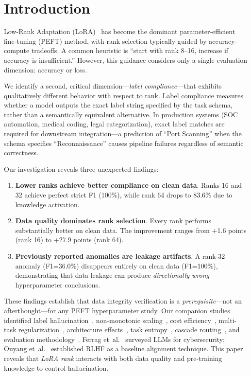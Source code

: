 \documentclass[journal]{IEEEtran}
\begin{document}
\section{Introduction}

Low-Rank Adaptation (LoRA)~\cite{hu2022} has become the dominant parameter-efficient fine-tuning (PEFT) method, with rank selection typically guided by accuracy-compute tradeoffs. A common heuristic is ``start with rank 8--16, increase if accuracy is insufficient.'' However, this guidance considers only a single evaluation dimension: accuracy or loss.

We identify a second, critical dimension---\emph{label compliance}---that exhibits qualitatively different behavior with respect to rank. Label compliance measures whether a model outputs the exact label string specified by the task schema, rather than a semantically equivalent alternative. In production systems (SOC automation, medical coding, legal categorization), exact label matches are required for downstream integration---a prediction of ``Port Scanning'' when the schema specifies ``Reconnaissance'' causes pipeline failures regardless of semantic correctness.

Our investigation reveals three unexpected findings:
\begin{enumerate}
\item \textbf{Lower ranks achieve better compliance on clean data}. Ranks 16 and 32 achieve perfect strict F1 (100\%), while rank 64 drops to 83.6\% due to knowledge activation.
\item \textbf{Data quality dominates rank selection}. Every rank performs substantially better on clean data. The improvement ranges from +1.6 points (rank 16) to +27.9 points (rank 64).
\item \textbf{Previously reported anomalies are leakage artifacts}. A rank-32 anomaly (F1=36.0\%) disappears entirely on clean data (F1=100\%), demonstrating that data leakage can produce \emph{directionally wrong} hyperparameter conclusions.
\end{enumerate}

These findings establish that data integrity verification is a \emph{prerequisite}---not an afterthought---for any PEFT hyperparameter study. Our companion studies identified label hallucination~\cite{p3}, non-monotonic scaling~\cite{p6}, cost efficiency~\cite{p7}, multi-task regularization~\cite{p15}, architecture effects~\cite{p21}, task entropy~\cite{p8}, cascade routing~\cite{p5}, and evaluation methodology~\cite{p19}. Ferrag et~al.~\cite{ferrag2024} surveyed LLMs for cybersecurity; Ouyang et~al.~\cite{ouyang2022} established RLHF as a baseline alignment technique. This paper reveals that \emph{LoRA rank} interacts with both data quality and pre-training knowledge to control hallucination.
\end{document}
